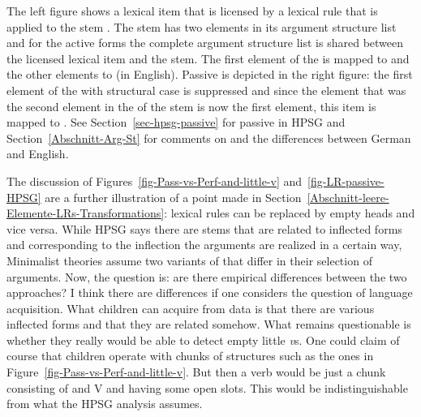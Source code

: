 The left figure shows a lexical item that is licensed by a lexical rule that is applied to the stem
. The stem has two elements in its argument structure list and for the active forms the
complete argument structure list is shared between the licensed lexical item and the stem. The first
element of the \argstl is mapped to \spr and the other elements to \comps (in English). Passive is
depicted in the right figure: the first element of the \argst with structural case is suppressed and
since the element that was the second element in the \argstl of the stem  is now the first element,
this item is mapped to \spr. See Section~\ref{sec-hpsg-passive} for passive in HPSG and Section~\ref{Abschnitt-Arg-St} for comments on
\argst and the differences between German and English. 

The discussion of Figures~\ref{fig-Pass-vs-Perf-and-little-v} and~\ref{fig-LR-passive-HPSG} are
a further illustration of a point made in Section~\ref{Abschnitt-leere-Elemente-LRs-Transformations}:
lexical rules can be replaced by empty heads and vice versa. While HPSG says there are stems that
are related to inflected forms and corresponding to the inflection the arguments are realized in a
certain way, Minimalist theories assume two variants of \littlev that differ in their selection of
arguments. Now, the question is: are there empirical differences between the two approaches? I think
there are differences if one considers the question of language acquisition. What children can
acquire from data is that there are various inflected forms and that they are related somehow. What
remains questionable is whether they really would be able to detect empty little \textit{v}s. One
could claim of course that children operate with chunks of structures such as the ones in
Figure~\ref{fig-Pass-vs-Perf-and-little-v}. But then a verb would be just a chunk consisting of
\littlev and V and having some open slots. This would be indistinguishable from what the HPSG
analysis assumes.


